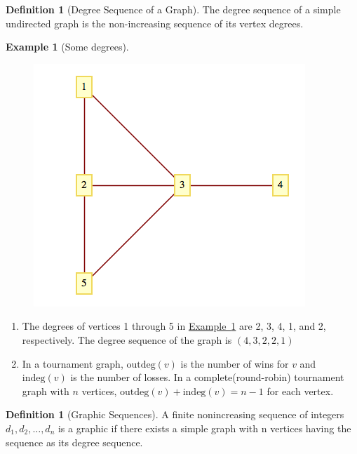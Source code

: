 \documentclass[10pt,]{book}
\theoremstyle{plain}
\theoremstyle{definition}
\newtheorem{definition}[theorem]{Definition}
\theoremstyle{definition}
\theoremstyle{definition}
\newtheorem{example}[theorem]{Example}
\theoremstyle{definition}
\theoremstyle{definition}
\numberwithin{equation}{section}
\begin{document}
\begin{definition}[Degree Sequence of a Graph]\label{def-degree-sequence}
The degree sequence of a simple undirected graph is the non-increasing sequence of its vertex degrees.%
\end{definition}
\begin{example}[Some degrees]\label{ex-degrees-9-1}
\leavevmode%
\begin{figure}
\centering
\includegraphics[width=1\linewidth]{images/fig-degrees-example-9-1.png}
\end{figure}
\leavevmode%
\begin{enumerate}[label=\alph*]
\item\hypertarget{li-6}{} The degrees of vertices 1 through 5 in \hyperref[ex-degrees-9-1]{Example~\ref{ex-degrees-9-1}} are 2, 3, 4, 1, and 2, respectively.  The degree sequence of the graph is \((4,3,2,2,1)\)%
\item\hypertarget{li-7}{} In a tournament graph, \(\text{outdeg}(v)\) is the number of wins for \(v\) and \(\text{indeg}(v)\) is the number of losses. In a complete(round-robin) tournament graph with \(n\) vertices, \(\text{outdeg}(v) + \text{indeg}(v) = n - 1\) for each vertex.%
\end{enumerate}
%
\end{example}
\begin{definition}[Graphic Sequences]\label{def-graphic-sequence}
A finite nonincreasing sequence of integers \(d_1,d_2, \ldots , d_n\) is a  graphic if there exists a simple graph with  n vertices
having the sequence as its degree sequence.%
\end{definition}
\end{document}
